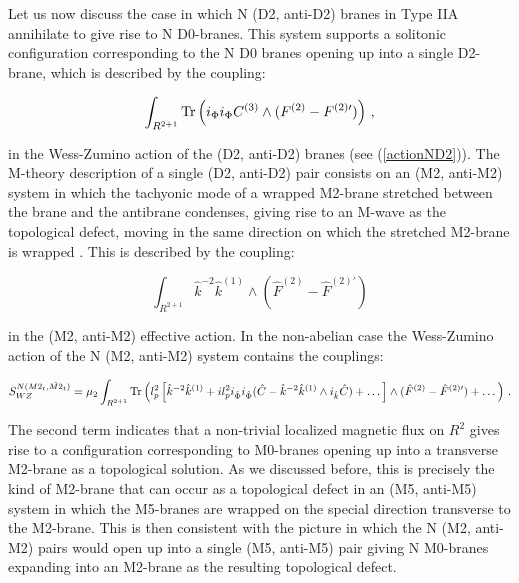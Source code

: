 \documentclass[12pt,a4paper]{article}
\begin{document}
Let us now discuss the case in which N (D2, anti-D2) branes
in Type IIA annihilate to give rise to N D0-branes. This system
supports a solitonic configuration corresponding to the N D0
branes opening up into a single D2-brane, which is described by the
coupling:

\begin{equation}
\label{D2antiD2}
\int_{R^{2+1}}{\rm Tr}\left(i_\Phi i_\Phi C^{(3)}\wedge 
(F^{(2)}-F^{(2)\prime})\right)\, ,
\end{equation}

\noindent in the Wess-Zumino action of the (D2, anti-D2) branes
(see (\ref{actionND2})).
The M-theory description of a single (D2, anti-D2) pair
consists on an (M2, anti-M2) system in which the tachyonic
mode of a wrapped M2-brane stretched between the brane and the
antibrane condenses, giving rise to an M-wave as the topological
defect, moving in the
same direction on which the stretched M2-brane is wrapped \cite{HL1}.
This is described by the coupling:

\begin{equation}
\int_{R^{2+1}} {\hat k}^{-2}{\hat k}^{(1)}\wedge 
({\hat F}^{(2)}-{\hat F}^{(2)\prime})
\end{equation}

\noindent in the (M2, anti-M2) effective action.
In the non-abelian case the Wess-Zumino action of the 
N (M2, anti-M2) system contains the couplings:

\begin{equation}
S^{N (M2_t, \bar{M2}_t)}_{WZ}=\mu_2\int_{R^{2+1}}{\rm Tr}
\left(l_p^2\left[{\hat k}^{-2}{\hat k}^{(1)}+il_p^2 i_{\hat \Phi}
i_{\hat \Phi}({\hat C}-{\hat k}^{-2}{\hat k}^{(1)}
\wedge i_{\hat k}{\hat C})+\dots\right]\wedge
({\hat F}^{(2)}-{\hat F}^{(2)\prime})+\dots\right)\, .
\end{equation}

\noindent The second term indicates that a non-trivial
localized magnetic flux on $R^2$ gives rise to
a configuration corresponding
to M0-branes opening up into a transverse M2-brane as
a topological solution.
As we discussed before, this is precisely the kind of M2-brane that
can occur as a topological
defect in an (M5, anti-M5) system in which the M5-branes are wrapped
on the special direction transverse to the M2-brane. 
This is then consistent with the picture in which the N (M2, anti-M2)
pairs would open up into a single (M5, anti-M5) pair giving 
N M0-branes expanding into an
M2-brane as the resulting topological defect.
\end{document}
